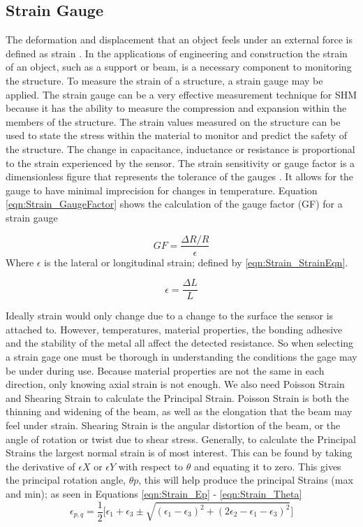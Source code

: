 \subsection{Strain Gauge}
\indent The deformation and displacement that an object feels under an external force is defined as strain \cite{OmegaEngineeering:2013}. In the applications of engineering and construction the strain of an object, such as a support or beam, is a necessary component to monitoring the structure. To measure the strain of a structure, a strain gauge may be applied. The strain gauge can be a very effective measurement technique for SHM because it has the ability to measure the compression and expansion within the members of the structure. The strain values measured on the structure can be used to state the stress within the material to monitor and predict the safety of the structure. The change in capacitance, inductance or resistance is proportional to the strain experienced by the sensor. The strain sensitivity or gauge factor is a dimensionless figure that represents the tolerance of the gauges . It allows for the gauge to have minimal imprecision for changes in temperature. Equation \ref{eqn:Strain_GaugeFactor} shows the calculation of the gauge factor (GF) for a strain gauge

\begin{equation}
GF = \frac{\Delta R / R}{\epsilon} 
\label{eqn:Strain_GaugeFactor}
\end{equation}
\indent Where $\epsilon$ is the lateral or longitudinal strain; defined by \ref{eqn:Strain_StrainEqn}.

\begin{equation}
\epsilon = \frac{\Delta L}{L}
\label{eqn:Strain_StrainEqn}
\end{equation} 

\indent Ideally strain would only change due to a change to the surface the sensor is attached to. However, temperatures, material properties, the bonding adhesive and the stability of the metal all affect the detected resistance. So when selecting a strain gage one must be thorough in understanding the conditions the gage may be under during use. Because material properties are not the same in each direction, only knowing axial strain is not enough. We also need Poisson Strain and Shearing Strain to calculate the Principal Strain. Poisson Strain is both the thinning and widening of the beam, as well as the elongation that the beam may feel under strain. Shearing Strain is the angular distortion of the beam, or the angle of rotation or twist due to shear stress. Generally, to calculate the Principal Strains the largest normal strain is of most interest. This can be found by taking the derivative of $\epsilon X$ or $\epsilon Y$ with respect to $\theta$ and equating it to zero. This gives the principal rotation angle, $\theta p$, this will help produce the principal Strains (max and min); as seen in Equations \ref{eqn:Strain_Ep} - \ref{eqn:Strain_Theta}
\begin{equation}
\epsilon_{p,q} = \frac{1}{2}\biggl[\epsilon_{1} + \epsilon_{3} \pm \sqrt{(\epsilon_{1}-\epsilon_{3})^{2}+(2\epsilon_{2}-\epsilon_{1}-\epsilon_{3})^{2}}\biggr]
\label{eqn:Strain_Ep}
\end{equation}

